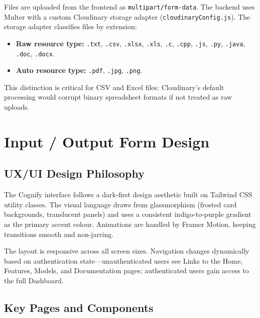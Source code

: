 \documentclass[12pt,a4paper]{article}
\begin{document}
Files are uploaded from the frontend as \texttt{multipart/form-data}. The backend uses Multer with a custom Cloudinary storage adapter (\texttt{cloudinaryConfig.js}). The storage adapter classifies files by extension:

\begin{itemize}
    \item \textbf{Raw resource type:} \texttt{.txt}, \texttt{.csv}, \texttt{.xlsx}, \texttt{.xls}, \texttt{.c}, \texttt{.cpp}, \texttt{.js}, \texttt{.py}, \texttt{.java}, \texttt{.doc}, \texttt{.docx}.
    \item \textbf{Auto resource type:} \texttt{.pdf}, \texttt{.jpg}, \texttt{.png}.
\end{itemize}

This distinction is critical for CSV and Excel files: Cloudinary's default processing would corrupt binary spreadsheet formats if not treated as raw uploads.

\clearpage

\section{Input / Output Form Design}

\subsection{UX/UI Design Philosophy}

The Cognify interface follows a dark-first design aesthetic built on Tailwind CSS utility classes. The visual language draws from glassmorphism (frosted card backgrounds, translucent panels) and uses a consistent indigo-to-purple gradient as the primary accent colour. Animations are handled by Framer Motion, keeping transitions smooth and non-jarring.

The layout is responsive across all screen sizes. Navigation changes dynamically based on authentication state—unauthenticated users see Links to the Home, Features, Models, and Documentation pages; authenticated users gain access to the full Dashboard.

\subsection{Key Pages and Components}
\end{document}
